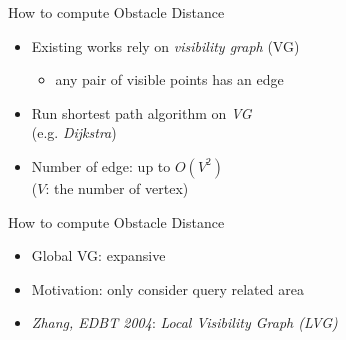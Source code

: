 \begin{frame}{How to compute Obstacle Distance}
\begin{minipage}{.4\textwidth}
\begin{itemize}
\item \small Existing works rely on \textit{visibility graph} (VG)
    \begin{itemize}
        \item \small any pair of visible points has an edge
    \end{itemize}
\item \small Run shortest path algorithm on \textit{VG}\\
    \tiny{(e.g. \textit{Dijkstra})}
\item \small {Number of edge: up to $O(V^2)$\\
            \tiny{($V$: the number of vertex})}
\end{itemize}
\end{minipage}%
\begin{minipage}{.6\textwidth}
\begin{adjustbox}{max totalsize={.9\textwidth}{.9\textheight}, right}
\end{adjustbox}
\end{minipage}
\end{frame}

\begin{frame}{How to compute Obstacle Distance}
\begin{minipage}{.4\textwidth}
\begin{itemize}
\item \small Global VG: expansive
\item \small Motivation: only consider query related area
\item \small {\textit{Zhang, EDBT 2004}: \textit{Local Visibility Graph (LVG)}}
\end{itemize}
\end{minipage}%
\begin{minipage}{.6\textwidth}
\begin{adjustbox}{max totalsize={.9\textwidth}{.9\textheight}, right}
\end{adjustbox}
\end{minipage}
\end{frame}

